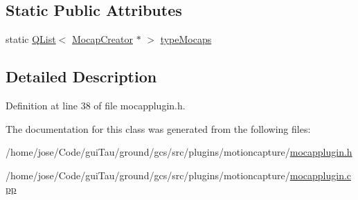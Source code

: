 \subsection*{Static Public Attributes}
\begin{DoxyCompactItemize}
\item 
static \hyperlink{class_q_list}{Q\-List}$<$ \hyperlink{class_mocap_creator}{Mocap\-Creator} $\ast$ $>$ \hyperlink{group___mo_cap_plugin_gaca68fd324d804c3124d7ba64b5d0294a}{type\-Mocaps}
\end{DoxyCompactItemize}


\subsection{Detailed Description}


Definition at line 38 of file mocapplugin.\-h.



The documentation for this class was generated from the following files\-:\begin{DoxyCompactItemize}
\item 
/home/jose/\-Code/gui\-Tau/ground/gcs/src/plugins/motioncapture/\hyperlink{mocapplugin_8h}{mocapplugin.\-h}\item 
/home/jose/\-Code/gui\-Tau/ground/gcs/src/plugins/motioncapture/\hyperlink{mocapplugin_8cpp}{mocapplugin.\-cpp}\end{DoxyCompactItemize}
